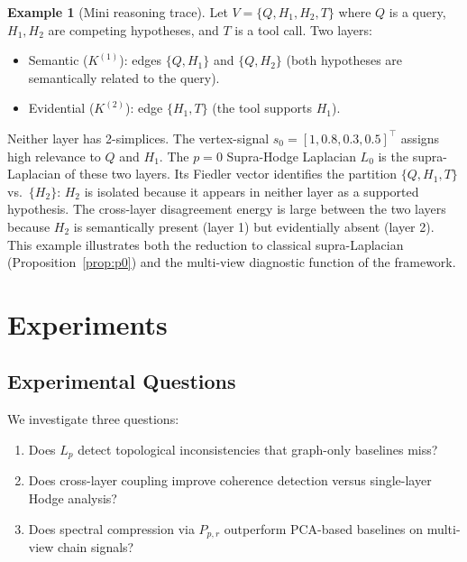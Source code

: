 \documentclass[11pt]{article}
\theoremstyle{definition}
\newtheorem{example}[theorem]{Example}
\theoremstyle{remark}
\newcommand{\Pp}{P_{p,r}}
\begin{document}
\begin{example}[Mini reasoning trace]
\label{ex:reasoning}
Let $V=\{Q, H_1, H_2, T\}$ where $Q$ is a query, $H_1, H_2$ are competing
hypotheses, and $T$ is a tool call. Two layers:
\begin{itemize}
\item Semantic ($K^{(1)}$): edges $\{Q,H_1\}$ and $\{Q,H_2\}$ (both hypotheses
      are semantically related to the query).
\item Evidential ($K^{(2)}$): edge $\{H_1,T\}$ (the tool supports $H_1$).
\end{itemize}
Neither layer has 2-simplices. The vertex-signal $s_0=[1, 0.8, 0.3, 0.5]^\top$
assigns high relevance to $Q$ and $H_1$. The $p=0$ Supra-Hodge Laplacian $L_0$
is the supra-Laplacian of these two layers. Its Fiedler vector identifies the
partition $\{Q, H_1, T\}$ vs.\ $\{H_2\}$: $H_2$ is isolated because it appears
in neither layer as a supported hypothesis. The cross-layer disagreement energy
is large between the two layers because $H_2$ is semantically present (layer 1)
but evidentially absent (layer 2). This example illustrates both the reduction
to classical supra-Laplacian (Proposition~\ref{prop:p0}) and the multi-view
diagnostic function of the framework.
\end{example}


\section{Experiments}
\label{sec:experiments}

\subsection{Experimental Questions}

We investigate three questions:
\begin{enumerate}
\item Does $L_p$ detect topological inconsistencies that graph-only baselines
      miss?
\item Does cross-layer coupling improve coherence detection versus single-layer
      Hodge analysis?
\item Does spectral compression via $\Pp$ outperform PCA-based baselines on
      multi-view chain signals?
\end{enumerate}
\end{document}
